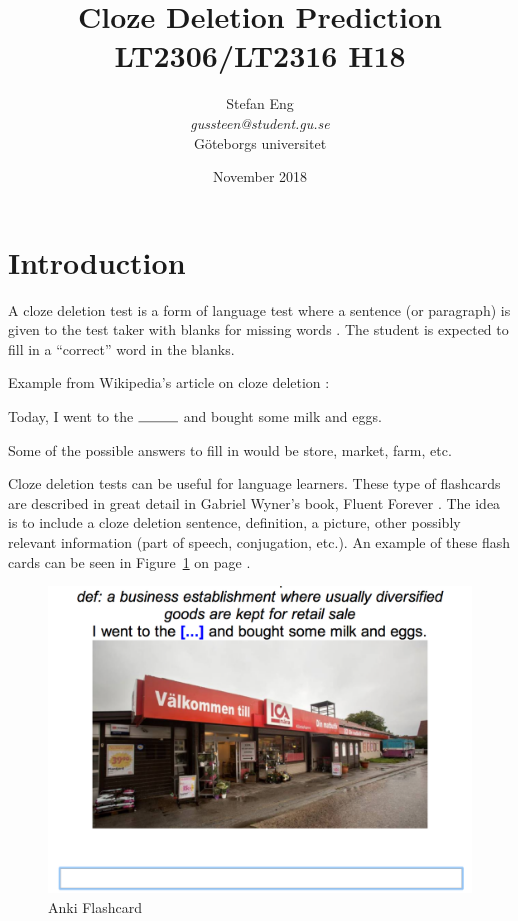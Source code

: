\documentclass[11pt,a4paper]{article}
\title{
Cloze Deletion Prediction\\
\large LT2306/LT2316 H18
}
\author{
Stefan Eng\\
\textit{gussteen@student.gu.se}\\
Göteborgs universitet
}
\date{November 2018}
\begin{document}
\maketitle

\section{Introduction}
A cloze deletion test is a form of language test where a sentence (or paragraph) is given to the test taker with blanks for missing words \cite{clozeproc}.
The student is expected to fill in a ``correct'' word in the blanks.

Example from Wikipedia's article on cloze deletion \cite{wiki:clozetest}: 
\begin{center}
    Today, I went to the $\rule{1cm}{0.15mm}$ and bought some milk and eggs.
\end{center}
Some of the possible answers to fill in would be store, market, farm, etc.

Cloze deletion tests can be useful for language learners. 
These type of flashcards are described in great detail in Gabriel Wyner's book, Fluent Forever \cite{fluentforever}. 
The idea is to include a cloze deletion sentence, definition, a picture, other possibly relevant information (part of speech, conjugation, etc.).
An example of these flash cards can be seen in Figure~\ref{fig:flashcard} on page \pageref{fig:flashcard}.

\begin{figure}[h!]
\centering
\includegraphics[scale=0.5]{cloze_example.png}
\caption{Anki Flashcard}
\label{fig:flashcard}
\end{figure}
\end{document}
